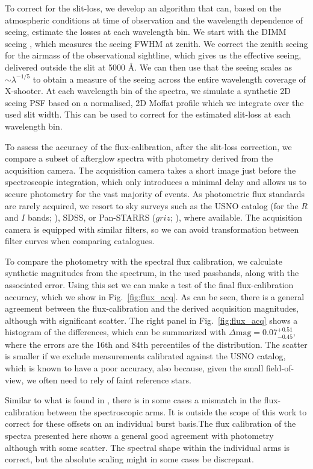 \documentclass[longauth]{aa}    %
\begin{document}
To correct for the slit-loss, we develop an algorithm that can, based on the
atmospheric conditions at time of observation and the wavelength dependence of
seeing, estimate the losses at each wavelength bin. We start with the DIMM
seeing \citep{Sarazin1990}, which measures the seeing FWHM at zenith. We correct
the zenith seeing for the airmass of the observational sightline, which gives us
the effective seeing, delivered outside the slit at 5000 \AA. We can then use
that the seeing scales as $\sim \lambda^{-1/5}$ to obtain a measure of the
seeing across the entire wavelength coverage of X-shooter. At each wavelength
bin of the spectra, we simulate a synthetic 2D seeing PSF based on a normalised,
2D Moffat profile which we integrate over the used slit width. This can be used to correct for the estimated slit-loss at each wavelength bin.

To assess the accuracy of the flux-calibration, after the slit-loss correction,
we compare a subset of afterglow spectra with photometry derived from the
acquisition camera. The acquisition camera takes a short image just before the
spectroscopic integration, which only introduces a minimal delay and allows us
to secure photometry for the vast majority of events. As photometric flux
standards are rarely acquired, we resort to sky surveys such as the USNO catalog
(for the $R$ and $I$ bands; \citealt{Monet2003}), SDSS, or Pan-STARRS ($griz$;
\citealt{Abolfathi2018,Chambers2016}), where available. The acquisition camera
is equipped with similar filters, so we can avoid transformation between filter
curves when comparing catalogues.

To compare the photometry with the spectral flux calibration,
we calculate synthetic magnitudes from the spectrum, in the used passbands,
along with the associated error. Using this set we can make a test of the final flux-calibration accuracy, which
we show in Fig.~\ref{fig:flux_acq}. As can be seen, there is a general agreement
between the flux-calibration and the derived acquisition magnitudes, although
with significant scatter. The right panel in Fig.~\ref{fig:flux_acq} shows a
histogram of the differences, which can be summarized with $\Delta \mathrm{mag}
= 0.07 ^{+0.51} _{-0.45} $, where the errors are the 16th and 84th percentiles of
the distribution. The scatter is smaller if we exclude measurements calibrated against the USNO catalog, which is known to have a poor accuracy, also because, given the small field-of-view, we often need to rely of faint reference stars.

Similar to what is found in \citet{Lopez2016}, there is in some cases a mismatch
in the flux-calibration between the spectroscopic arms. It is outside the scope
of this work to correct for these offsets on an individual burst basis.The flux
calibration of the spectra presented here shows a general good agreement with
photometry although with some scatter. The spectral shape within the
individual arms is correct, but the absolute scaling might in some cases be
discrepant.
\end{document}
